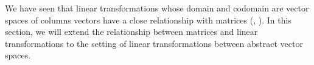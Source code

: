 %
\begin{introduction}
\begin{para}We have seen that linear transformations whose domain and codomain are vector spaces of columns vectors have a close relationship with matrices (, ).  In this section, we will extend the relationship between matrices and linear transformations to the setting of linear transformations between abstract vector spaces.\end{para}
\end{introduction}
%
